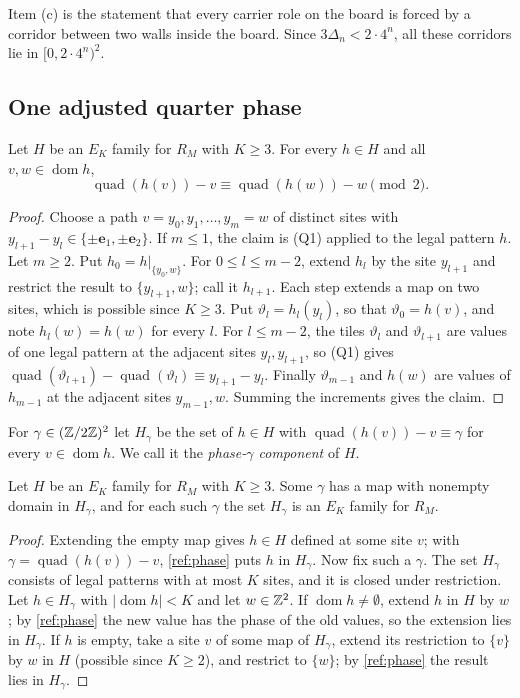 Item (c) is the statement that every carrier role on the board is forced by a corridor between two walls inside the board. Since $3\Delta_n<2\cdot4^n$, all these corridors lie in $[0,2\cdot4^n)^2$.

\subsection{One adjusted quarter phase}\label{ref:sec-phase}

\begin{lemma}\label{ref:phase}
Let $H$ be an $E_K$ family for $R_M$ with $K\ge3$. For every $h\in H$ and all $v,w\in\operatorname{dom}h$,
\[
\operatorname{quad}(h(v))-v\equiv\operatorname{quad}(h(w))-w\pmod 2 .
\]
\end{lemma}

\begin{proof}
Choose a path $v=y_0,y_1,\dots,y_m=w$ of distinct sites with $y_{l+1}-y_l\in\{\pm\mathbf e_1,\pm\mathbf e_2\}$. If $m\le1$, the claim is (Q1) applied to the legal pattern $h$. Let $m\ge2$. Put $h_0=h|_{\{y_0,w\}}$. For $0\le l\le m-2$, extend $h_l$ by the site $y_{l+1}$ and restrict the result to $\{y_{l+1},w\}$; call it $h_{l+1}$. Each step extends a map on two sites, which is possible since $K\ge3$. Put $\vartheta_l=h_l(y_l)$, so that $\vartheta_0=h(v)$, and note $h_l(w)=h(w)$ for every $l$. For $l\le m-2$, the tiles $\vartheta_l$ and $\vartheta_{l+1}$ are values of one legal pattern at the adjacent sites $y_l,y_{l+1}$, so (Q1) gives $\operatorname{quad}(\vartheta_{l+1})-\operatorname{quad}(\vartheta_l)\equiv y_{l+1}-y_l$. Finally $\vartheta_{m-1}$ and $h(w)$ are values of $h_{m-1}$ at the adjacent sites $y_{m-1},w$. Summing the increments gives the claim.
\end{proof}

For $\gamma\in(\mathbb{Z}/2\mathbb{Z})^2$ let $H_\gamma$ be the set of $h\in H$ with $\operatorname{quad}(h(v))-v\equiv\gamma$ for every $v\in\operatorname{dom}h$. We call it the \emph{phase-$\gamma$ component} of $H$.

\begin{lemma}\label{ref:component}
Let $H$ be an $E_K$ family for $R_M$ with $K\ge3$. Some $\gamma$ has a map with nonempty domain in $H_\gamma$, and for each such $\gamma$ the set $H_\gamma$ is an $E_K$ family for $R_M$.
\end{lemma}

\begin{proof}
Extending the empty map gives $h\in H$ defined at some site $v$; with $\gamma=\operatorname{quad}(h(v))-v$, \cref{ref:phase} puts $h$ in $H_\gamma$. Now fix such a $\gamma$. The set $H_\gamma$ consists of legal patterns with at most $K$ sites, and it is closed under restriction. Let $h\in H_\gamma$ with $|\operatorname{dom}h|<K$ and let $w\in\mathbb{Z}^2$. If $\operatorname{dom}h\ne\emptyset$, extend $h$ in $H$ by $w$; by \cref{ref:phase} the new value has the phase of the old values, so the extension lies in $H_\gamma$. If $h$ is empty, take a site $v$ of some map of $H_\gamma$, extend its restriction to $\{v\}$ by $w$ in $H$ (possible since $K\ge2$), and restrict to $\{w\}$; by \cref{ref:phase} the result lies in $H_\gamma$.
\end{proof}

